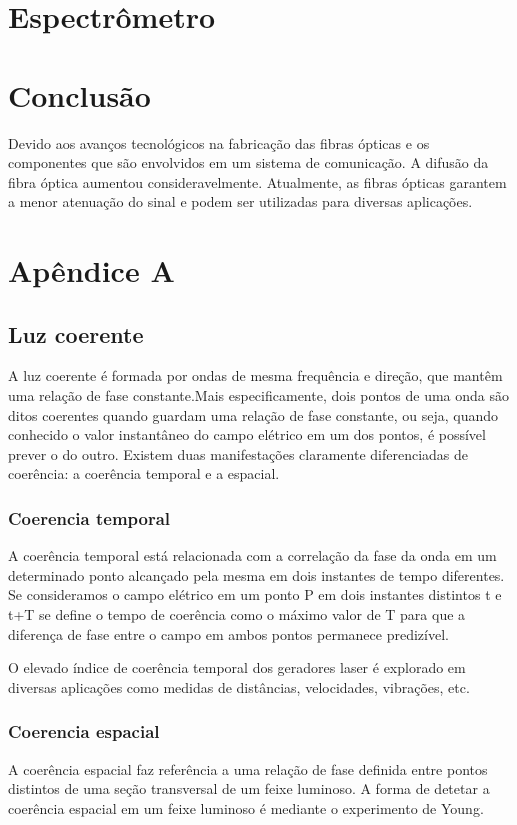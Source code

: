 \documentclass[article]{IEEEtran}
\begin{document}
\section{Espectrômetro}


\section{Conclusão}
Devido aos avanços tecnológicos na fabricação das fibras ópticas e os componentes que são envolvidos em um sistema de comunicação. A difusão da fibra óptica aumentou consideravelmente. Atualmente, as fibras ópticas garantem a menor atenuação do sinal e podem ser utilizadas para diversas aplicações.
\clearpage
\appendix
\section{Apêndice A}
\subsection{Luz coerente}
\label{ap:l-coerente}
A luz coerente é formada por ondas de mesma frequência e direção, que mantêm uma relação de fase constante.Mais especificamente, dois pontos de uma onda são ditos coerentes quando guardam uma relação de fase constante, ou seja, quando conhecido o valor instantâneo do campo elétrico em um dos pontos, é possível prever o do outro. Existem duas manifestações claramente diferenciadas de coerência: a coerência temporal e a espacial.

\subsubsection{Coerencia temporal}
A coerência temporal está relacionada com a correlação da fase da onda em um determinado ponto alcançado pela mesma em dois instantes de tempo diferentes. Se consideramos o campo elétrico em um ponto P em dois instantes distintos t e t+T se define o tempo de coerência como o máximo valor de T para que a diferença de fase entre o campo em ambos pontos permanece predizível.
\par O elevado índice de coerência temporal dos geradores laser é explorado em diversas aplicações como medidas de distâncias, velocidades, vibrações, etc.
\subsubsection{Coerencia espacial}
A coerência espacial faz referência a uma relação de fase definida entre pontos distintos de uma seção transversal de um feixe luminoso.
A forma de detetar a coerência espacial em um feixe luminoso é mediante o experimento de Young. 


\end{document}

